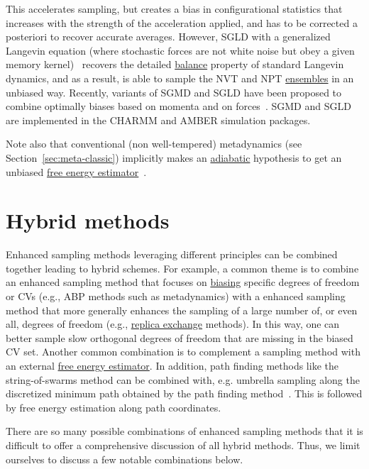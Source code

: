 \documentclass[9pt,review]{livecoms}
\begin{document}
This accelerates sampling, but creates a bias in configurational statistics that increases with the strength of the acceleration applied, and has to be corrected a posteriori to recover accurate averages.
However, SGLD with a generalized Langevin equation (where stochastic forces are not white noise but obey a given memory kernel)~\cite{Wu2015_SGLD-GLE} recovers the detailed \hyperlink{ref:Balance} {balance} property of standard Langevin dynamics, and as a result, is able to sample the NVT and NPT \hyperlink{ref:Ensemble} {ensembles} in an unbiased way.
Recently, variants of SGMD and SGLD have been proposed to combine optimally biases based on momenta and on forces~\cite{Wu2020_SGLDg}.
SGMD and SGLD are implemented in the CHARMM and AMBER simulation packages.

Note also that conventional (non well-tempered) metadynamics (see Section~\ref{sec:meta-classic}) implicitly makes an \hyperlink{ref:AdiabaticDyn} {adiabatic} hypothesis to get an unbiased \hyperlink{ref:FEestimator} {free energy estimator}~\cite{laio-gervasio-08, jourdain-lelievre-zitt-21}.


\section{Hybrid methods}
\label{sec:hybrids}

Enhanced sampling methods leveraging different principles can be combined together leading to hybrid schemes.
For example, a common theme is to combine an enhanced sampling method that focuses on \hyperlink{ref:biasingE} {biasing} specific degrees of freedom or CVs (e.g., ABP methods such as metadynamics) with a enhanced sampling method that more generally enhances the sampling of a large number of, or even all, degrees of freedom (e.g., \hyperlink{ref:ReplEx} {replica exchange} methods). In this way, one can better sample slow orthogonal degrees of freedom that are missing in the biased CV set.
Another common combination is to complement a sampling method with an external \hyperlink{ref:FEestimator} {free energy estimator}.
In addition, path finding methods like the string-of-swarms method can be combined with, e.g. umbrella sampling along the discretized minimum path obtained by the path finding method~\cite{doi:10.1021/jp0777059}. This is followed by free energy estimation along path coordinates.

There are so many possible combinations of enhanced sampling methods that it is difficult to offer a comprehensive discussion of all hybrid methods. Thus, we limit ourselves to discuss a few notable combinations below.
\end{document}
